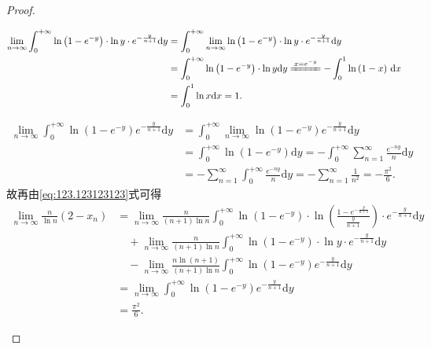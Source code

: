 \documentclass[../../main.tex]{subfiles}%
\begin{document}
\begin{proof}
\begin{enumerate}[(1)]
\begin{align*}
\lim\limits_{n\rightarrow \infty}\int_0^{+\infty} \ln \left( 1-e^{-y} \right) \cdot \ln y\cdot e^{-\frac{y}{n+1}}\mathrm{d}y&=\int_0^{+\infty} \lim\limits_{n\rightarrow \infty}\ln \left( 1-e^{-y} \right) \cdot \ln y\cdot e^{-\frac{y}{n+1}}\mathrm{d}y\\
&=\int_0^{+\infty} \ln \left( 1-e^{-y} \right) \cdot \ln y\mathrm{d}y\xlongequal{x=e^{-y}}-\int_0^1 \ln \left( 1-x \right)\,\mathrm{d}x\\
&=\int_0^1 \ln x\mathrm{d}x=1.
\end{align*}

\begin{align*}
\lim\limits_{n\rightarrow \infty}\int_0^{+\infty} \ln \left( 1-e^{-y} \right) e^{-\frac{y}{n+1}}\mathrm{d}y&=\int_0^{+\infty} \lim\limits_{n\rightarrow \infty}\ln \left( 1-e^{-y} \right) e^{-\frac{y}{n+1}}\mathrm{d}y\\
&=\int_0^{+\infty} \ln \left( 1-e^{-y} \right) \mathrm{d}y=-\int_0^{+\infty} \sum\limits_{n=1}^{\infty} \frac{e^{-ny}}{n}\mathrm{d}y\\
&=-\sum\limits_{n=1}^{\infty} \int_0^{+\infty} \frac{e^{-ny}}{n}\mathrm{d}y=-\sum\limits_{n=1}^{\infty} \frac{1}{n^2}=-\frac{\pi ^2}{6}.
\end{align*}
故再由\eqref{eq:123.123123123}式可得
\begin{align*}
\lim\limits_{n\rightarrow \infty}\frac{n}{\ln n}\left( 2-x_n \right)&=\lim\limits_{n\rightarrow \infty}\frac{n}{\left( n+1 \right) \ln n}\int_0^{+\infty} \ln \left( 1-e^{-y} \right) \cdot \ln \left( \frac{1-e^{-\frac{y}{n+1}}}{\frac{y}{n+1}} \right) \cdot e^{-\frac{y}{n+1}}\mathrm{d}y\\
&\quad +\lim\limits_{n\rightarrow \infty}\frac{n}{\left( n+1 \right) \ln n}\int_0^{+\infty} \ln \left( 1-e^{-y} \right) \cdot \ln y\cdot e^{-\frac{y}{n+1}}\mathrm{d}y\\
&\quad -\lim\limits_{n\rightarrow \infty}\frac{n\ln \left( n+1 \right)}{\left( n+1 \right) \ln n}\int_0^{+\infty} \ln \left( 1-e^{-y} \right) e^{-\frac{y}{n+1}}\mathrm{d}y\\
&=\lim\limits_{n\rightarrow \infty}\int_0^{+\infty} \ln \left( 1-e^{-y} \right) e^{-\frac{y}{n+1}}\mathrm{d}y\\
&=\frac{\pi ^2}{6}.
\end{align*}
\end{enumerate}
\end{proof}
\end{document}
